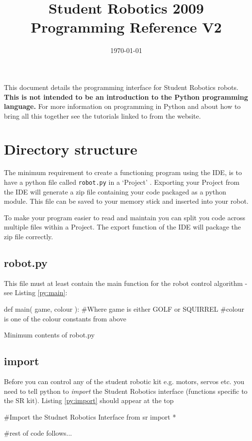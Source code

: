 \documentclass[a4paper, 12pt]{article}
\title {Student Robotics 2009\\ Programming Reference V2}
\date{\today}
\begin{document}
\maketitle

\noindent This document details the programming interface for Student Robotics
robots. {\bf This is not intended to be an introduction to the Python programming language.} For more information on programming in Python and about how to bring all this together see the tutorials linked to from the website. 

\section{Directory structure}
The minimum  requirement to create a functioning program using the IDE, is to have a python file called \texttt{robot.py} in a `Project' . Exporting your Project from the IDE will generate a zip file containing your code packaged as a python module. This file can be saved to your memory stick and inserted into your robot.

To make your program easier to read and maintain you can split you code across multiple files within a Project. The export function of the IDE will package the zip file correctly.

\subsection{robot.py}
This file must at least contain the main function for the robot control
algorithm - see Listing \ref{py:main}:

\begin{python}
\begin{verbatimtab}
def main( game, colour ):
        #Where game is either GOLF or SQUIRREL
        #colour is one of the colour constants from above
\end{verbatimtab}
  \caption{\label{py:main}Minimum contents of robot.py} 
\end{python}

\subsection{import}
Before you can control any of the student robotic kit e.g. motors, servos etc. you need to tell python to \textit{import} the Student Robotics interface (functions specific to the SR kit). Listing \ref{py:import} should appear at the top
\begin{python}
\begin{verbatimtab}
#Import the Studnet Robotics Interface	
from sr import * 

#rest of code follows...
\end{verbatimtab}
  \caption{\label{py:import}} 
\end{python}
\end{document}
